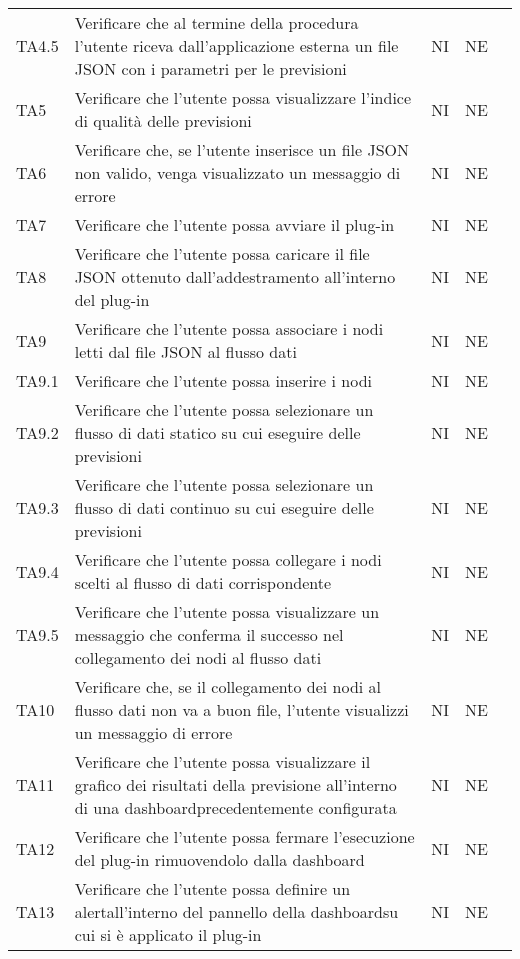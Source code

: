 \begin{longtable} {
		>{}p{15mm} 
		>{}p{79.5mm}
		>{}p{15mm} 
		>{}p{15mm}
		>{}p{0mm}}
	TA4.5	& Verificare che al termine della procedura l'utente riceva dall'applicazione esterna un file JSON con i parametri per le previsioni & NI & NE  &\TBstrut \\ [2mm]
	TA5		& Verificare che l'utente possa visualizzare l'indice di qualità delle previsioni & NI & NE  &\TBstrut \\ [2mm]
	TA6		& Verificare che, se l'utente inserisce un file JSON non valido, venga visualizzato un messaggio di errore & NI & NE  &\TBstrut \\ [2mm]
	TA7		& Verificare che l'utente possa avviare il plug-in & NI & NE  &\TBstrut \\ [2mm]
	TA8		& Verificare che l'utente possa caricare il file JSON ottenuto dall'addestramento all'interno del plug-in & NI & NE  &\TBstrut \\ [2mm]
	TA9		& Verificare che l'utente possa associare i nodi letti dal file JSON al flusso dati & NI & NE  &\TBstrut \\ [2mm]
	TA9.1	& Verificare che l'utente possa inserire i nodi & NI & NE  &\TBstrut \\ [2mm]
	TA9.2	& Verificare che l'utente possa selezionare un flusso di dati statico su cui eseguire delle previsioni & NI & NE  &\TBstrut \\ [2mm]
	TA9.3	& Verificare che l'utente possa selezionare un flusso di dati continuo su cui eseguire delle previsioni & NI & NE  &\TBstrut \\ [2mm]
	TA9.4	& Verificare che l'utente possa collegare i nodi scelti al flusso di dati corrispondente & NI & NE  &\TBstrut \\ [2mm]
	TA9.5	& Verificare che l'utente possa visualizzare un messaggio che conferma il successo nel collegamento dei nodi al flusso dati & NI & NE  &\TBstrut \\ [2mm]
	TA10	& Verificare che, se il collegamento dei nodi al flusso dati non va a buon file, l'utente visualizzi un messaggio di errore & NI & NE  &\TBstrut \\ [2mm]
	TA11	& Verificare che l'utente possa visualizzare il grafico dei risultati della previsione all'interno di una dashboard\glosp precedentemente configurata & NI & NE  &\TBstrut \\ [2mm]
	TA12	& Verificare che l'utente possa fermare l'esecuzione del plug-in rimuovendolo dalla dashboard\glo & NI & NE  &\TBstrut \\ [2mm]
	TA13	& Verificare che l'utente possa definire un alert\glosp all'interno del pannello della dashboard\glosp su cui si è applicato il plug-in & NI & NE  &\TBstrut \\ [2mm]

\end{longtable}
